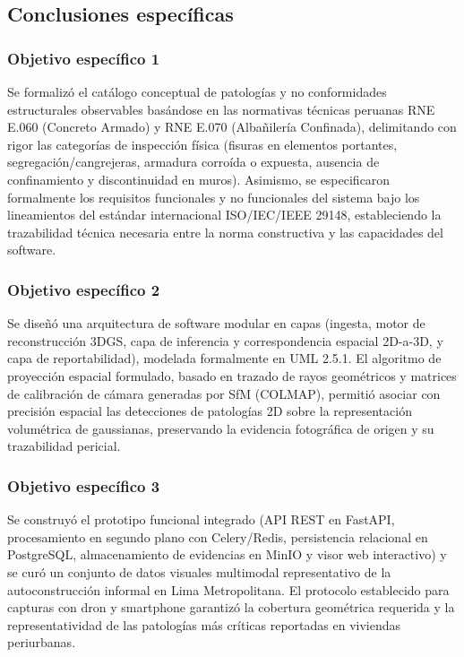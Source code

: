 \documentclass[12pt,oneside]{report}
\begin{document}
\subsection{Conclusiones específicas}

\subsubsection{Objetivo específico 1}
Se formalizó el catálogo conceptual de patologías y no conformidades estructurales observables basándose en las normativas técnicas peruanas RNE E.060 (Concreto Armado) y RNE E.070 (Albañilería Confinada), delimitando con rigor las categorías de inspección física (fisuras en elementos portantes, segregación/cangrejeras, armadura corroída o expuesta, ausencia de confinamiento y discontinuidad en muros). Asimismo, se especificaron formalmente los requisitos funcionales y no funcionales del sistema bajo los lineamientos del estándar internacional ISO/IEC/IEEE 29148, estableciendo la trazabilidad técnica necesaria entre la norma constructiva y las capacidades del software.\par

\subsubsection{Objetivo específico 2}
Se diseñó una arquitectura de software modular en capas (ingesta, motor de reconstrucción 3DGS, capa de inferencia y correspondencia espacial 2D-a-3D, y capa de reportabilidad), modelada formalmente en UML 2.5.1. El algoritmo de proyección espacial formulado, basado en trazado de rayos geométricos y matrices de calibración de cámara generadas por SfM (COLMAP), permitió asociar con precisión espacial las detecciones de patologías 2D sobre la representación volumétrica de gaussianas, preservando la evidencia fotográfica de origen y su trazabilidad pericial.\par

\subsubsection{Objetivo específico 3}
Se construyó el prototipo funcional integrado (API REST en FastAPI, procesamiento en segundo plano con Celery/Redis, persistencia relacional en PostgreSQL, almacenamiento de evidencias en MinIO y visor web interactivo) y se curó un conjunto de datos visuales multimodal representativo de la autoconstrucción informal en Lima Metropolitana. El protocolo establecido para capturas con dron y smartphone garantizó la cobertura geométrica requerida y la representatividad de las patologías más críticas reportadas en viviendas periurbanas.\par
\end{document}
